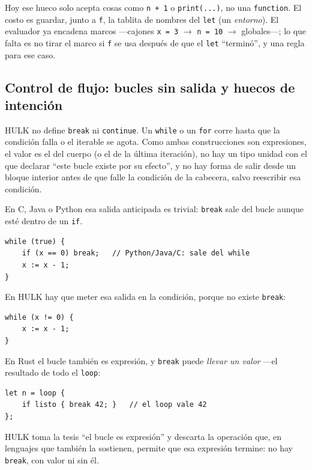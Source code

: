 \documentclass[11pt,a4paper]{article}
\begin{document}
Hoy ese hueco solo acepta cosas como \texttt{n + 1} o \texttt{print(...)}, no una \texttt{function}. El costo es guardar, junto a \texttt{f}, la tablita de nombres del \texttt{let} (un \emph{entorno}). El evaluador ya encadena marcos ---cajones \texttt{x = 3} $\rightarrow$ \texttt{n = 10} $\rightarrow$ globales---; lo que falta es no tirar el marco si \texttt{f} se usa después de que el \texttt{let} ``terminó'', y una regla para ese caso.

\subsection{Control de flujo: bucles sin salida y huecos de intención}

HULK no define \texttt{break} ni \texttt{continue}. Un \texttt{while} o un \texttt{for} corre hasta que la condición falla o el iterable se agota. Como ambas construcciones son expresiones, el valor es el del cuerpo (o el de la última iteración), no hay un tipo unidad con el que declarar ``este bucle existe por su efecto'', y no hay forma de salir desde un bloque interior antes de que falle la condición de la cabecera, salvo reescribir esa condición.

En C, Java o Python esa salida anticipada es trivial: \texttt{break} sale del bucle aunque esté dentro de un \texttt{if}.

\begin{lstlisting}[language={},numbers=none]
while (true) {
    if (x == 0) break;   // Python/Java/C: sale del while
    x := x - 1;
}
\end{lstlisting}

En HULK hay que meter esa salida en la condición, porque no existe \texttt{break}:

\begin{lstlisting}[language={},numbers=none]
while (x != 0) {
    x := x - 1;
}
\end{lstlisting}

En Rust el bucle también es expresión, y \texttt{break} puede \emph{llevar un valor} ---el resultado de todo el \texttt{loop}:

\begin{lstlisting}[language={},numbers=none]
let n = loop {
    if listo { break 42; }   // el loop vale 42
};
\end{lstlisting}

HULK toma la tesis ``el bucle es expresión'' y descarta la operación que, en lenguajes que también la sostienen, permite que esa expresión termine: no hay \texttt{break}, con valor ni sin él.
\end{document}
